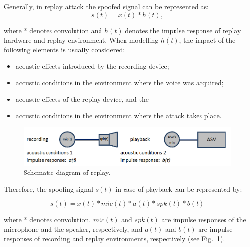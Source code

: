 Generally, in replay attack the spoofed signal can be represented as:
\begin{equation}
s(t) = x(t)*h(t),
\label{eq:replay}
\end{equation}

\noindent where * denotes convolution and $h(t)$ denotes the impulse response of replay hardware and replay environment. When modelling $h(t)$, the impact of the following elements is usually considered:

\begin{itemize}
\item acoustic effects introduced by the recording device;
\item acoustic conditions in the environment where the voice was acquired;
\item acoustic effects of the replay device, and the
\item acoustic conditions in the environment where the attack takes place. 
\end{itemize}

\begin{figure}
	\includegraphics[width=1\linewidth]{Figs/replay.png}

	\caption{Schematic diagram of replay.}
	\label{fig::Replay}
\end{figure}


Therefore, the spoofing signal $s(t)$ in case of playback can be represented by:

\begin{equation}
s(t) = x(t)* mic(t) * a(t) * spk(t) * b(t)
\label{eq::playback}
\end{equation}

where * denotes convolution, $mic(t)$ and $spk(t)$ are impulse responses of the microphone and the speaker, respectively, and $a(t)$ and $b(t)$ are impulse responses of recording and replay environments, respectively (see Fig.~\ref{fig::Replay}). 

